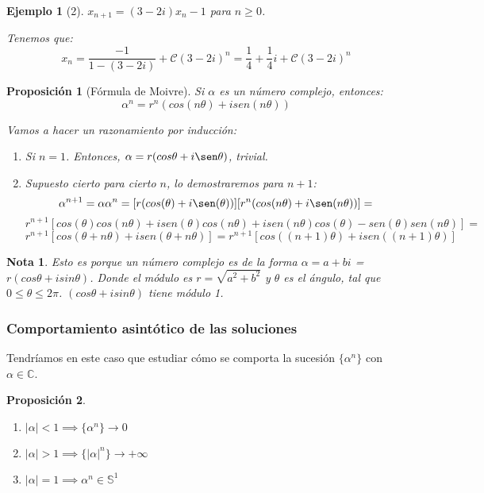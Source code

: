 \documentclass[11pt, a4paper, titlepage]{article}
\makeatletter
\renewenvironment{proof}[1][\proofname] {\vspace{-15pt}\par\pushQED{\qed}\normalfont\topsep6\p@\@plus6\p@\relax\trivlist\item[\hskip\labelsep\it#1\@addpunct{.}]\ignorespaces}{\popQED\endtrivlist\@endpefalse}
\theoremstyle{theorem-style}
\newtheorem*{nprop}{Proposición}
\theoremstyle{definition-style}
\theoremstyle{remark-style}
\newtheorem*{nota}{Nota}
\theoremstyle{example-style}
\newtheorem*{ejemplo}{Ejemplo}
\newenvironment{nlist}
{\begin{enumerate}
\renewcommand\labelenumi{(\emph{\roman{enumi})}}}
{\end{enumerate}}
\makeatother
\begin{document}
\begin{ejemplo}[2]
	$x_{n+1}=(3-2i)x_n -1$ para $n\geq 0$. 
	\begin{proof}[Solución]
	Tenemos que:
	\[
	x_n = \frac{-1}{1-(3-2i)}+\mathcal{C}(3-2i)^n = \frac{1}{4} + \frac{1}{4}i + \mathcal{C}(3-2i)^n
	\]
\end{proof}
\end{ejemplo}

\begin{nprop}[Fórmula de Moivre]
	Si $\alpha$ es un número complejo, entonces:
	\[
	\alpha^n = r^n(cos(n\theta) + i sen(n\theta))
	\]
	\begin{proof}
	Vamos a hacer un razonamiento por inducción:
	\begin{enumerate}
	\item Si $n=1$. Entonces, $\alpha = r(cos\theta +i\sen\theta)$, trivial.
	\item Supuesto cierto para cierto $n$, lo demostraremos para $n+1$:
	\[
	\alpha^{n+1} = \alpha\alpha^n =  [r(cos(\theta) +i\sen(\theta))] [r^n(cos(n\theta) +i\sen(n\theta))]=
	\]
	\[
	r^{n+1}[cos(\theta) cos(n\theta) +i sen(\theta) cos(n\theta) + isen(n\theta) cos(\theta) - sen(\theta) sen(n\theta)] = \]
	\[r^{n+1}[cos(\theta+n\theta)+isen(\theta+n\theta)] = r^{n+1}[cos((n+1)\theta)+isen((n+1)\theta)]
	\]
\end{enumerate}
	
\end{proof}
\end{nprop}

\begin{nota}
	Esto es porque un número complejo es de la forma $\alpha = a+bi$ = $r(cos\theta + i sin\theta)$.
	Donde el módulo es $r=\sqrt{a^2 + b^2}$ y $\theta$ es el ángulo, tal que $0 \leq \theta \leq 2\pi$.
	$(cos\theta + i sin\theta)$ tiene módulo 1.
	
\end{nota}

\subsubsection{Comportamiento asintótico de las soluciones}
Tendríamos en este caso que estudiar cómo se comporta la sucesión $\{\alpha^n\}$ con $\alpha \in \mathbb{C}$.
\begin{nprop}\hfill
\begin{nlist}
	\item $|\alpha|< 1 \implies \{\alpha^n\}\to 0$
	\item $|\alpha|> 1 \implies \{|\alpha|^n\}\to +\infty$
	\item $|\alpha| = 1 \implies \alpha^n \in \mathbb{S}^1$
\end{nlist}
	
\end{nprop}
\end{document}
